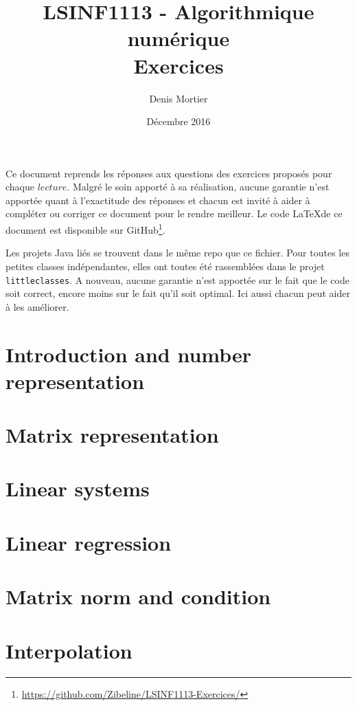 \documentclass{article}
\title{LSINF1113 - Algorithmique numérique\\Exercices}
\author{Denis Mortier}
\date{Décembre 2016}
\begin{document}
\maketitle

Ce document reprends les réponses aux questions des exercices proposés pour chaque $lecture$. Malgré le soin apporté à sa réalisation, aucune garantie n'est apportée quant à l'exactitude des réponses et chacun est invité à aider à compléter ou corriger ce document pour le rendre meilleur. Le code \LaTeX de ce document est disponible sur GitHub\footnote{\url{https://github.com/Zibeline/LSINF1113-Exercices/}}.

Les projets Java liés se trouvent dans le même repo que ce fichier. Pour toutes les petites classes indépendantes, elles ont toutes été rassemblées dans le projet \texttt{littleclasses}. A nouveau, aucune garantie n'est apportée sur le fait que le code soit correct, encore moins sur le fait qu'il soit optimal. Ici aussi chacun peut aider à les améliorer.

\section{Introduction and number representation}


\section{Matrix representation}


\section{Linear systems}


\section{Linear regression}


\section{Matrix norm and condition}


\section{Interpolation}

\end{document}
